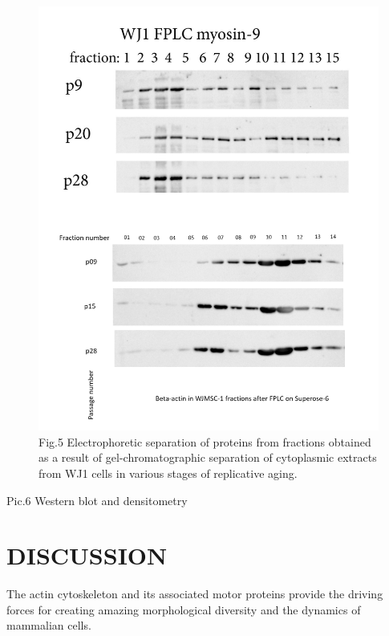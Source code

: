 \documentclass[a4paper,12pt]{article}
\begin{document}
\begin{figure}[hbt!]
\centering
\includegraphics[width=0.8\linewidth]{fig5.png}
\caption{Fig.5 Electrophoretic separation of proteins from fractions obtained as a result of gel-chromatographic separation of cytoplasmic extracts from WJ1 cells in various stages of replicative aging.}
\label{fig:fig5}
\end{figure}

Pic.6 Western blot and densitometry



\section{DISCUSSION}

The actin cytoskeleton and its associated motor proteins provide the driving forces for creating amazing morphological diversity and the dynamics of mammalian cells.
\end{document}
